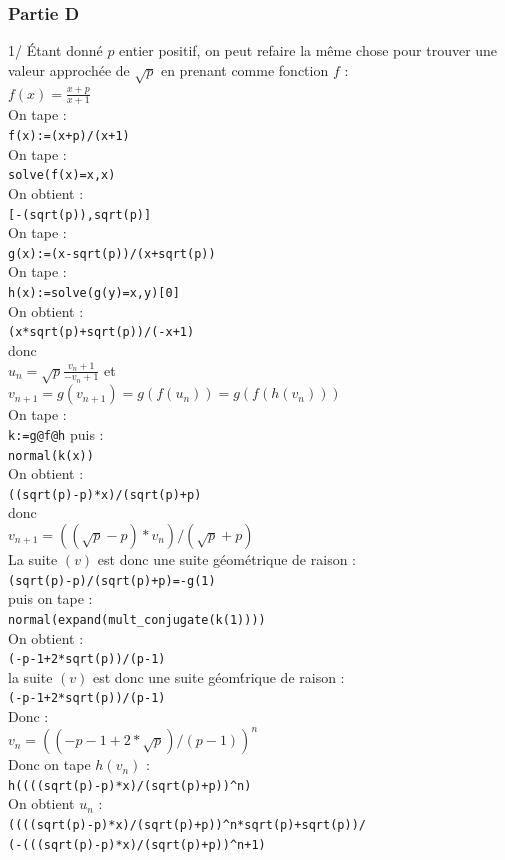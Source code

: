 \documentclass[a4paper,11pt]{book}
\begin{document}
\subsubsection{Partie D}
1/ \'Etant donn\'e $p$ entier positif, on peut refaire la m\^eme chose pour 
trouver une valeur approch\'ee de 
$\sqrt p$ en prenant comme fonction $f$ : \\
$\displaystyle f(x)=\frac{x+p}{x+1}$\\
On tape :\\
{\tt f(x):=(x+p)/(x+1)} \\
On tape :\\
{\tt solve(f(x)=x,x)}\\
On obtient :\\
{\tt [-(sqrt(p)),sqrt(p)]}\\
On tape :\\
{\tt g(x):=(x-sqrt(p))/(x+sqrt(p))} \\
On tape :\\
{\tt h(x):=solve(g(y)=x,y)[0]}\\
On obtient :\\
{\tt (x*sqrt(p)+sqrt(p))/(-x+1)}\\
donc \\
$\displaystyle u_n=\sqrt p \frac{v_n+1}{-v_n+1}$ et\\
$v_{n+1}=g(v_{n+1})=g(f(u_n))=g(f(h(v_n)))$\\
On tape :\\
{\tt k:=g@f@h}
puis :\\
{\tt normal(k(x))}\\
On obtient :\\
{\tt ((sqrt(p)-p)*x)/(sqrt(p)+p)}\\
 donc \\
$v_{n+1}=((\sqrt p-p)*v_n)/(\sqrt p+p)$\\
La suite $(v)$ est donc une suite g\'eom\'etrique de raison :\\
{\tt (sqrt(p)-p)/(sqrt(p)+p)=-g(1)}\\
puis on tape :\\
{\tt normal(expand(mult\_conjugate(k(1))))}\\
On obtient :\\
{\tt (-p-1+2*sqrt(p))/(p-1)}\\
la suite $(v)$ est donc une suite g\'eom\'trique de raison :\\
{\tt (-p-1+2*sqrt(p))/(p-1)}\\
Donc :\\
$v_n=((-p-1+2*\sqrt p)/(p-1))^n$\\
Donc on tape $h(v_n)$ :\\
{\tt h((((sqrt(p)-p)*x)/(sqrt(p)+p))\verb|^|n)}\\
On obtient $u_n$ :\\
{\tt ((((sqrt(p)-p)*x)/(sqrt(p)+p))\verb|^|n*sqrt(p)+sqrt(p))/\\
(-(((sqrt(p)-p)*x)/(sqrt(p)+p))\verb|^|n+1)}
\end{document}
